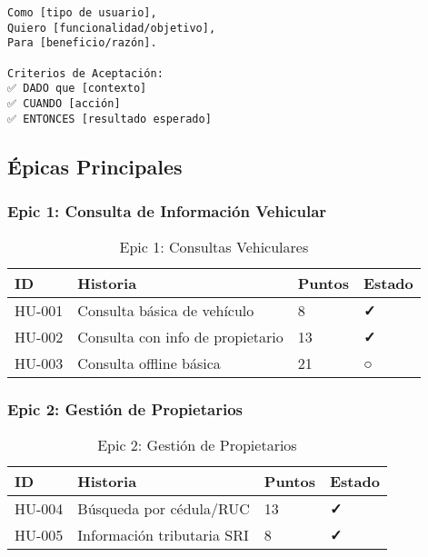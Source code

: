 \documentclass[12pt,a4paper]{article}
\begin{document}
\begin{lstlisting}
Como [tipo de usuario],
Quiero [funcionalidad/objetivo],
Para [beneficio/razón].

Criterios de Aceptación:
✅ DADO que [contexto]
✅ CUANDO [acción]
✅ ENTONCES [resultado esperado]
\end{lstlisting}

\subsection{Épicas Principales}

\subsubsection{Epic 1: Consulta de Información Vehicular}

\begin{table}[h]
\centering
\begin{tabularx}{\textwidth}{|l|X|l|l|}
\hline
\textbf{ID} & \textbf{Historia} & \textbf{Puntos} & \textbf{Estado} \\
\hline
HU-001 & Consulta básica de vehículo & 8 & \textcolor{epngreen}{\textbf{✓}} \\
\hline
HU-002 & Consulta con info de propietario & 13 & \textcolor{epngreen}{\textbf{✓}} \\
\hline
HU-003 & Consulta offline básica & 21 & \textcolor{epngray}{○} \\
\hline
\end{tabularx}
\caption{Epic 1: Consultas Vehiculares}
\end{table}

\subsubsection{Epic 2: Gestión de Propietarios}

\begin{table}[h]
\centering
\begin{tabularx}{\textwidth}{|l|X|l|l|}
\hline
\textbf{ID} & \textbf{Historia} & \textbf{Puntos} & \textbf{Estado} \\
\hline
HU-004 & Búsqueda por cédula/RUC & 13 & \textcolor{epngreen}{\textbf{✓}} \\
\hline
HU-005 & Información tributaria SRI & 8 & \textcolor{epngreen}{\textbf{✓}} \\
\hline
\end{tabularx}
\caption{Epic 2: Gestión de Propietarios}
\end{table}
\end{document}
